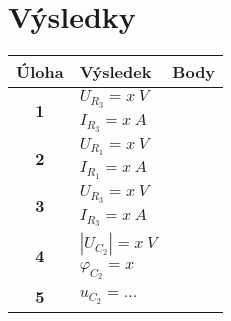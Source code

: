 \section*{Výsledky}

\begin{tabularx}{\textwidth}{|c|X|c|}
	\hline
	\textbf{Úloha} & \textbf{Výsledek} & \textbf{Body} \\
	\hline
	\multirow{2}{*}{\textbf{1}} & $U_{R_{3}} = x~V$ & \\
	& $I_{R_{3}} = x~A$ & \\
	\hline
	\multirow{2}{*}{\textbf{2}} & $U_{R_{1}} = x~V$ & \\
	& $I_{R_{1}} = x~A$ & \\
	\hline
	\multirow{2}{*}{\textbf{3}} & $U_{R_{3}} = x~V$ & \\
	& $I_{R_{3}} = x~A$ & \\
	\hline
	\multirow{2}{*}{\textbf{4}} & $|U_{C_{2}}| = x~V$ & \\
	& $\varphi_{C_{2}} = x$ & \\
	\hline
	\textbf{5} & $u_{C_{2}} = \dots$ & \\
	\hline
\end{tabularx}